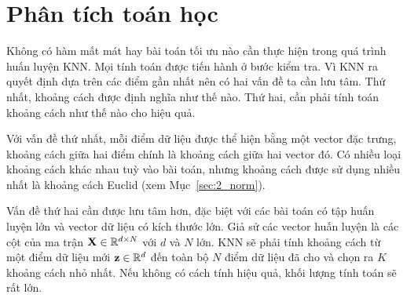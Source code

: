 




\section{Phân tích toán học}
Không có hàm mất mát hay bài toán tối ưu nào cần thực hiện trong quá trình
huấn luyện KNN. Mọi tính toán được tiến hành ở bước kiểm tra. Vì KNN ra quyết
định dựa trên các điểm gần nhất nên có hai vấn đề ta cần lưu tâm. Thứ nhất,
khoảng cách được định nghĩa như thế nào. Thứ hai, cần phải tính toán khoảng cách
như thế nào cho hiệu quả.

Với vấn đề thứ nhất, mỗi điểm dữ liệu được thể hiện bằng một vector đặc trưng,
khoảng cách giữa hai điểm chính là khoảng cách giữa hai vector đó. Có nhiều loại khoảng cách khác nhau tuỳ vào bài toán, nhưng khoảng cách được sử dụng nhiều nhất là khoảng cách Euclid (xem Mục~\ref{sec:2_norm}).


Vấn đề thứ hai cần được lưu tâm hơn, đặc biệt với {các bài toán có tập huấn
luyện lớn và vector dữ liệu có kích thước lớn}. Giả sử các vector huấn luyện là
các cột của ma trận $\mathbf{X}\in \mathbb{R}^{d\times N}$ với $d$ và $N$ lớn. KNN sẽ phải tính khoảng cách từ một điểm dữ liệu mới $\mathbf{z} \in \mathbb{R}^{d}$ đến toàn bộ $N$ điểm
dữ liệu đã cho và chọn ra $K$ khoảng cách nhỏ nhất. Nếu không có cách tính hiệu
quả, khối lượng tính toán sẽ rất lớn.

